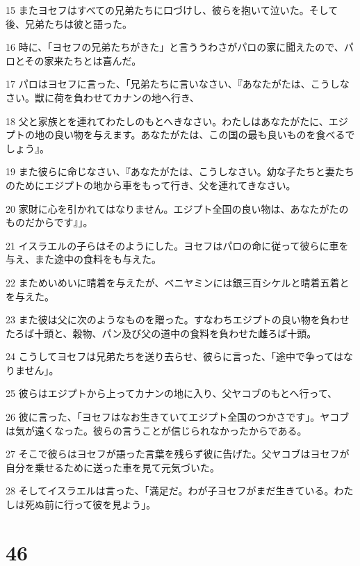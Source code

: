 \par 15 またヨセフはすべての兄弟たちに口づけし、彼らを抱いて泣いた。そして後、兄弟たちは彼と語った。
\par 16 時に、「ヨセフの兄弟たちがきた」と言ううわさがパロの家に聞えたので、パロとその家来たちとは喜んだ。
\par 17 パロはヨセフに言った、「兄弟たちに言いなさい、『あなたがたは、こうしなさい。獣に荷を負わせてカナンの地へ行き、
\par 18 父と家族とを連れてわたしのもとへきなさい。わたしはあなたがたに、エジプトの地の良い物を与えます。あなたがたは、この国の最も良いものを食べるでしょう』。
\par 19 また彼らに命じなさい、『あなたがたは、こうしなさい。幼な子たちと妻たちのためにエジプトの地から車をもって行き、父を連れてきなさい。
\par 20 家財に心を引かれてはなりません。エジプト全国の良い物は、あなたがたのものだからです』」。
\par 21 イスラエルの子らはそのようにした。ヨセフはパロの命に従って彼らに車を与え、また途中の食料をも与えた。
\par 22 まためいめいに晴着を与えたが、ベニヤミンには銀三百シケルと晴着五着とを与えた。
\par 23 また彼は父に次のようなものを贈った。すなわちエジプトの良い物を負わせたろば十頭と、穀物、パン及び父の道中の食料を負わせた雌ろば十頭。
\par 24 こうしてヨセフは兄弟たちを送り去らせ、彼らに言った、「途中で争ってはなりません」。
\par 25 彼らはエジプトから上ってカナンの地に入り、父ヤコブのもとへ行って、
\par 26 彼に言った、「ヨセフはなお生きていてエジプト全国のつかさです」。ヤコブは気が遠くなった。彼らの言うことが信じられなかったからである。
\par 27 そこで彼らはヨセフが語った言葉を残らず彼に告げた。父ヤコブはヨセフが自分を乗せるために送った車を見て元気づいた。
\par 28 そしてイスラエルは言った、「満足だ。わが子ヨセフがまだ生きている。わたしは死ぬ前に行って彼を見よう」。

\chapter{46}


